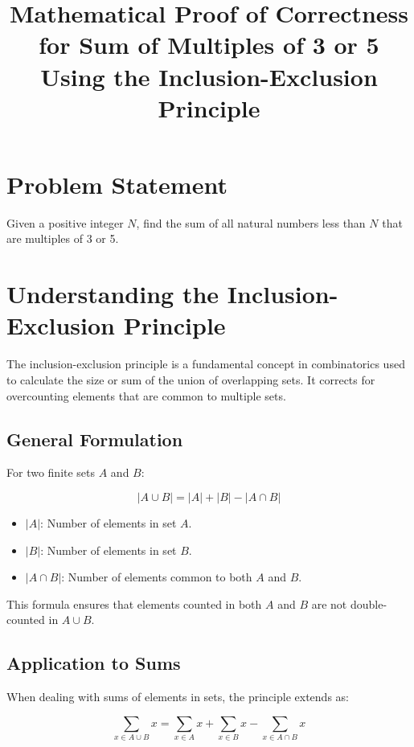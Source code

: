 \documentclass{article}
\title{Mathematical Proof of Correctness for Sum of Multiples of 3 or 5 Using the Inclusion-Exclusion Principle}
\author{}
\date{}
\begin{document}
\maketitle

\section*{Problem Statement}

Given a positive integer \( N \), find the sum of all natural numbers less than \( N \) that are multiples of 3 or 5.

\section*{Understanding the Inclusion-Exclusion Principle}

The inclusion-exclusion principle is a fundamental concept in combinatorics used to calculate the size or sum of the union of overlapping sets. It corrects for overcounting elements that are common to multiple sets.

\subsection*{General Formulation}

For two finite sets \( A \) and \( B \):

\[
|A \cup B| = |A| + |B| - |A \cap B|
\]

\begin{itemize}
    \item \( |A| \): Number of elements in set \( A \).
    \item \( |B| \): Number of elements in set \( B \).
    \item \( |A \cap B| \): Number of elements common to both \( A \) and \( B \).
\end{itemize}

This formula ensures that elements counted in both \( A \) and \( B \) are not double-counted in \( A \cup B \).

\subsection*{Application to Sums}

When dealing with sums of elements in sets, the principle extends as:

\[
\sum_{x \in A \cup B} x = \sum_{x \in A} x + \sum_{x \in B} x - \sum_{x \in A \cap B} x
\]
\end{document}

